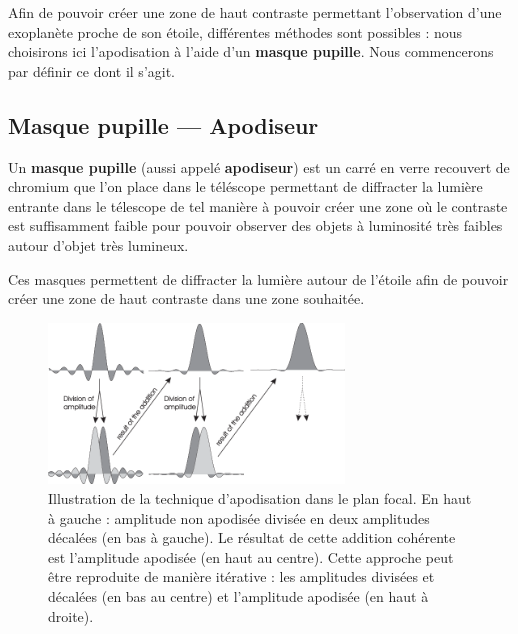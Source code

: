 Afin de pouvoir créer une zone de haut contraste permettant l'observation d'une exoplanète proche de son étoile, différentes méthodes sont possibles : nous choisirons ici l’apodisation à l’aide d’un \textbf{masque pupille}. Nous commencerons par définir ce dont il s'agit.

\subsection{Masque pupille — Apodiseur}

Un \textbf{masque pupille} (aussi appelé \textbf{apodiseur}) est un carré en verre recouvert de chromium que l'on place dans le téléscope permettant de diffracter la lumière entrante dans le télescope de tel manière à pouvoir créer une zone où le contraste est suffisamment faible pour pouvoir observer des objets à luminosité très faibles autour d'objet très lumineux.

Ces masques permettent de diffracter la lumière autour de l’étoile afin de pouvoir créer une zone de haut contraste dans une zone souhaitée.


\begin{figure}[htbp]
    \centering
    \includegraphics[width=0.7\textwidth]{figures/apod_explanation.png}
    \caption{Illustration de la technique d'apodisation dans le plan focal. En haut à gauche : amplitude non apodisée divisée en deux amplitudes décalées (en bas à gauche). Le résultat de cette addition cohérente est l'amplitude apodisée (en haut au centre). Cette approche peut être reproduite de manière itérative : les amplitudes divisées et décalées (en bas au centre) et l'amplitude apodisée (en haut à droite). }%
\end{figure}

